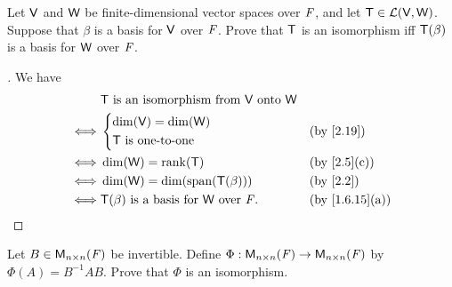 \setcounter{ex}{14}
\begin{ex}\label{ex:2.4.15}
	Let \(\mathsf{V}\) and \(\mathsf{W}\) be finite-dimensional vector spaces over \(\mathit{F}\), and let \(\mathsf{T} \in \mathcal{L}(\mathsf{V}, \mathsf{W})\).
	Suppose that \(\beta\) is a basis for \(\mathsf{V}\) over \(\mathit{F}\).
	Prove that \(\mathsf{T}\) is an isomorphism iff \(\mathsf{T}(\beta)\) is a basis for \(\mathsf{W}\) over \(\mathit{F}\).
\end{ex}

\begin{proof}[]
	We have
	\begin{align*}
		     & \T \text{ is an isomorphism from } \V \text{ onto } \W                     \\
		\iff & \begin{dcases}
			       \dim(\V) = \dim(\W) \\
			       \T \text{ is one-to-one}
		       \end{dcases}                               &  & \by{2.19}                  \\
		\iff & \dim(\W) = \rk{\T}                                     &  & \by{2.5}[c]    \\
		\iff & \dim(\W) = \dim(\spn{\T(\beta)})                       &  & \by{2.2}       \\
		\iff & \T(\beta) \text{ is a basis for } \W \text{ over } \F. &  & \by{1.6.15}[a]
	\end{align*}
\end{proof}

\begin{ex}\label{ex:2.4.16}
	Let \(B \in \mathsf{M}_{{n} \times n}({\mathit{F}})\) be invertible.
	Define \(\Phi : \mathsf{M}_{{n} \times n}({\mathit{F}}) \to \mathsf{M}_{{n} \times n}({\mathit{F}})\) by \(\Phi(A) = B^{-1} AB\).
	Prove that \(\Phi\) is an isomorphism.
\end{ex}

